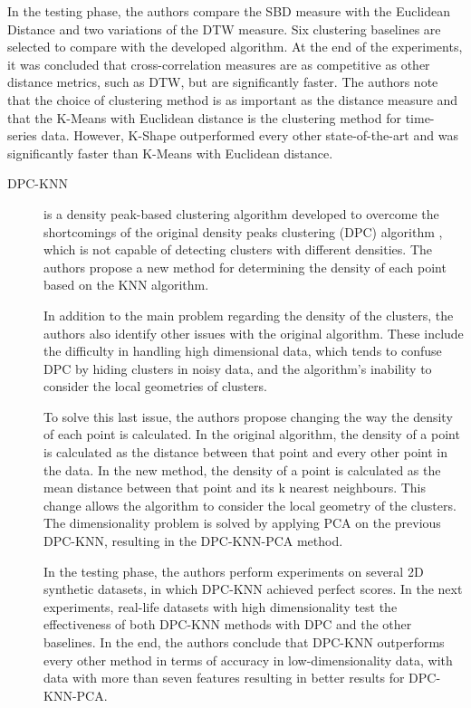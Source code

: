 \begin{description}
    In the testing phase, the authors compare the SBD measure with the Euclidean Distance and two variations of the DTW measure. Six clustering baselines are selected to compare with the developed algorithm. At the end of the experiments, it was concluded that cross-correlation measures are as competitive as other distance metrics, such as DTW, but are significantly faster. The authors note that the choice of clustering method is as important as the distance measure and that the K-Means with Euclidean distance is the clustering method for time-series data. However, K-Shape outperformed every other state-of-the-art and was significantly faster than K-Means with Euclidean distance.
\end{description}

\begin{description}
    \item[DPC-KNN]\cite{Du.Ding.ea_Studydensitypeaks_2016} is a density peak-based clustering algorithm developed to overcome the shortcomings of the original density peaks clustering (DPC) algorithm \cite{Rodriguez.Laio_Clusteringfastsearch_2014}, which is not capable of detecting clusters with different densities. The authors propose a new method for determining the density of each point based on the KNN algorithm. 
    
    In addition to the main problem regarding the density of the clusters, the authors also identify other issues with the original algorithm. These include the difficulty in handling high dimensional data, which tends to confuse DPC by hiding clusters in noisy data, and the algorithm's inability to consider the local geometries of clusters. 
    
    To solve this last issue, the authors propose changing the way the density of each point is calculated. In the original algorithm, the density of a point is calculated as the distance between that point and every other point in the data. In the new method, the density of a point is calculated as the mean distance between that point and its k nearest neighbours. This change allows the algorithm to consider the local geometry of the clusters. The dimensionality problem is solved by applying PCA on the previous DPC-KNN, resulting in the DPC-KNN-PCA method.

    In the testing phase, the authors perform experiments on several 2D synthetic datasets, in which DPC-KNN achieved perfect scores. In the next experiments, real-life datasets with high dimensionality test the effectiveness of both DPC-KNN methods with DPC and the other baselines. In the end, the authors conclude that DPC-KNN outperforms every other method in terms of accuracy in low-dimensionality data, with data with more than seven features resulting in better results for DPC-KNN-PCA.
\end{description}

